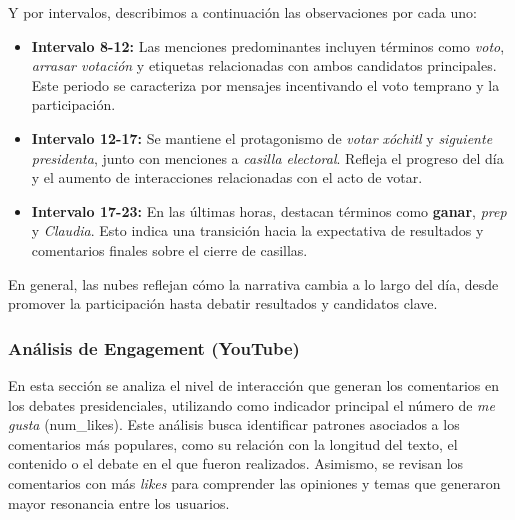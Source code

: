 \documentclass[10pt, a4paper]{article}
\begin{document}
	Y por intervalos, describimos a continuación las observaciones por cada uno:
	
	\begin{itemize}
		\item \textbf{Intervalo 8-12:} Las menciones predominantes incluyen términos como \textit{voto}, \textit{arrasar votación} y etiquetas relacionadas con ambos candidatos principales. Este periodo se caracteriza por mensajes incentivando el voto temprano y la participación.
		
		\item \textbf{Intervalo 12-17:} Se mantiene el protagonismo de \textit{votar xóchitl} y \textit{siguiente presidenta}, junto con menciones a \textit{casilla electoral}. Refleja el progreso del día y el aumento de interacciones relacionadas con el acto de votar.
		
		\item \textbf{Intervalo 17-23:} En las últimas horas, destacan términos como \textbf{ganar}, \textit{prep} y \textit{Claudia}. Esto indica una transición hacia la expectativa de resultados y comentarios finales sobre el cierre de casillas.
	\end{itemize}
	En general, las nubes reflejan cómo la narrativa cambia a lo largo del día, desde promover la participación hasta debatir resultados y candidatos clave.
	
	
	\subsubsection{Análisis de Engagement (YouTube)}
	
	En esta sección se analiza el nivel de interacción que generan los comentarios en los debates presidenciales, utilizando como indicador principal el número de \textit{me gusta} (num\_likes). Este análisis busca identificar patrones asociados a los comentarios más populares, como su relación con la longitud del texto, el contenido o el debate en el que fueron realizados. Asimismo, se revisan los comentarios con más \textit{likes} para comprender las opiniones y temas que generaron mayor resonancia entre los usuarios.
	
\end{document}
